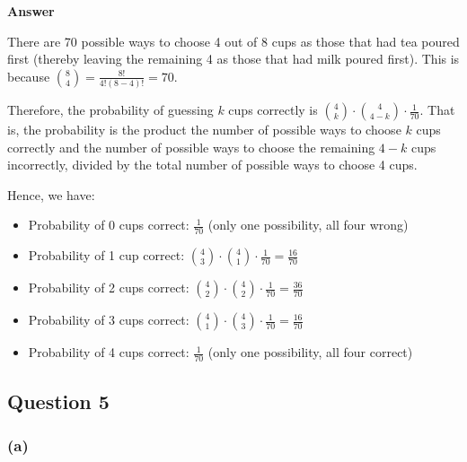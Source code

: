 \documentclass[
  11pt,
  letterpaper,
  DIV=11,
  numbers=noendperiod]{scrartcl}
\providecommand{\tightlist}{%
  \setlength{\itemsep}{0pt}\setlength{\parskip}{0pt}}\usepackage{longtable,booktabs,array}
\begin{document}
\begin{tcolorbox}[enhanced jigsaw, breakable, leftrule=.75mm, toprule=.15mm, arc=.35mm, bottomrule=.15mm, left=2mm, opacityback=0, colback=white, colframe=quarto-callout-note-color-frame, rightrule=.15mm]

\textbf{Answer}\vspace{2mm}

There are 70 possible ways to choose 4 out of 8 cups as those that had
tea poured first (thereby leaving the remaining 4 as those that had milk
poured first). This is because
\({8 \choose 4} = \frac{8!}{4!(8-4)!} = 70\).

Therefore, the probability of guessing \(k\) cups correctly is
\({4 \choose k} \cdot {4 \choose 4-k} \cdot \frac{1}{70}\). That is, the
probability is the product the number of possible ways to choose \(k\)
cups correctly and the number of possible ways to choose the remaining
\(4-k\) cups incorrectly, divided by the total number of possible ways
to choose 4 cups.

Hence, we have:

\begin{itemize}
\tightlist
\item
  Probability of 0 cups correct: \(\frac{1}{70}\) (only one possibility,
  all four wrong)
\item
  Probability of 1 cup correct:
  \({4\choose 3} \cdot {4\choose 1} \cdot \frac{1}{70} = \frac{16}{70}\)
\item
  Probability of 2 cups correct:
  \({4\choose 2} \cdot {4\choose 2} \cdot \frac{1}{70} = \frac{36}{70}\)
\item
  Probability of 3 cups correct:
  \({4\choose 1} \cdot {4\choose 3} \cdot \frac{1}{70} = \frac{16}{70}\)
\item
  Probability of 4 cups correct: \(\frac{1}{70}\) (only one possibility,
  all four correct)
\end{itemize}

\end{tcolorbox}

\newpage{}

\hypertarget{question-5}{%
\subsection{Question 5}\label{question-5}}

\hypertarget{a-1}{%
\subsubsection{(a)}\label{a-1}}
\end{document}
